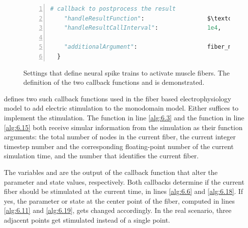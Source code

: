 \begin{figure}
\begin{framed}
\begin{lstlisting}[basicstyle=\footnotesize\ttfamily,commentstyle=\color{gray},numbers=left,language=python]
    # callback to postprocess the result
    "handleResultFunction":                  $\textcolor{Maroon}{\text{\ttfamily handle\_result}}$,    $\label{alg:6.41}$
    "handleResultCallInterval":              1e4,         
     
    "additionalArgument":                    fiber_no,        $\label{alg:6.43}$
  }

\end{lstlisting}
\end{framed}
\caption{Settings that define neural spike trains to activate muscle fibers. The definition of the two callback functions  and  is demonstrated.}%
\label{fig:example_callback_functions}%
\end{figure}

 defines two such callback functions used in the fiber based electrophysiology model to add electric stimulation to the monodomain model. Either suffices to implement the stimulation. The function  in line \ref{alg:6.3} and the function  in line \ref{alg:6.15} both receive simular information from the simulation as their function arguments: the total number  of nodes in the current fiber, the current integer timestep number  and the corresponding floating-point number  of the current simulation time, and the number  that identifies the current fiber.

The variables  and  are the output of the callback function that alter the parameter and state values, respectively. Both callbacks determine if the current fiber should be stimulated at the current time, in lines \ref{alg:6.6} and \ref{alg:6.18}.
If yes, the parameter or state at the center point of the fiber, computed in lines \ref{alg:6.11} and \ref{alg:6.19}, gets changed accordingly. In the real scenario, three adjacent points get stimulated instead of a single point.

